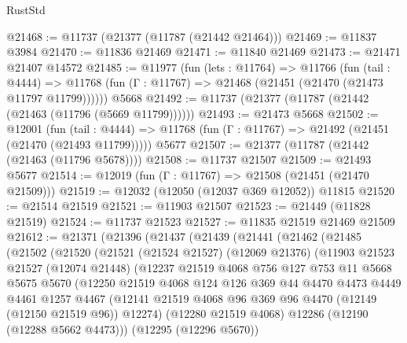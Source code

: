 \begin{lexlean}{RustStd}
\begin{coremodule}
@21468 := @11737 (@21377 (@11787 (@21442 @21464)))
@21469 := @11837 @3984
@21470 := @11836 @21469
@21471 := @11840 @21469
@21473 := @21471 @21407 @14572
@21485 := @11977
    (fun (lets : @11764) =>
    @11766
      (fun (tail : @4444) =>
      @11768 (fun (Γ : @11767) => @21468 (@21451 (@21470 (@21473 @11797 @11799))))))
    @5668
@21492 := @11737 (@21377 (@11787 (@21442 (@21463 (@11796 (@5669 @11799))))))
@21493 := @21473 @5668
@21502 := @12001
    (fun (tail : @4444) => @11768 (fun (Γ : @11767) => @21492 (@21451 (@21470 (@21493 @11799)))))
    @5677
@21507 := @21377 (@11787 (@21442 (@21463 (@11796 @5678))))
@21508 := @11737 @21507
@21509 := @21493 @5677
@21514 := @12019 (fun (Γ : @11767) => @21508 (@21451 (@21470 @21509)))
@21519 := @12032 (@12050 (@12037 @369 @12052)) @11815
@21520 := @21514 @21519
@21521 := @11903 @21507
@21523 := @21449 (@11828 @21519)
@21524 := @11737 @21523
@21527 := @11835 @21519 @21469 @21509
@21612 := @21371
    (@21396
      (@21437
        (@21439
          (@21441
            (@21462
              (@21485
                (@21502
                  (@21520
                    (@21521
                      (@21524 @21527)
                      (@12069 @21376)
                      (@11903
                        @21523
                        @21527
                        (@12074 @21448)
                        (@12237
                          @21519
                          @4068
                          @756
                          @127
                          @753
                          @11
                          @5668
                          @5675
                          @5670
                          (@12250
                            @21519
                            @4068
                            @124
                            @126
                            @369
                            @44
                            @4470
                            @4473
                            @4449
                            @4461
                            @1257
                            @4467
                            (@12141
                              @21519
                              @4068
                              @96
                              @369
                              @96
                              @4470
                              (@12149 (@12150 @21519 @96))
                              @12274)
                            (@12280 @21519 @4068)
                            @12286
                            (@12190 (@12288 @5662 @4473)))
                          (@12295 (@12296 @5670))

\end{coremodule}
\end{lexlean}
